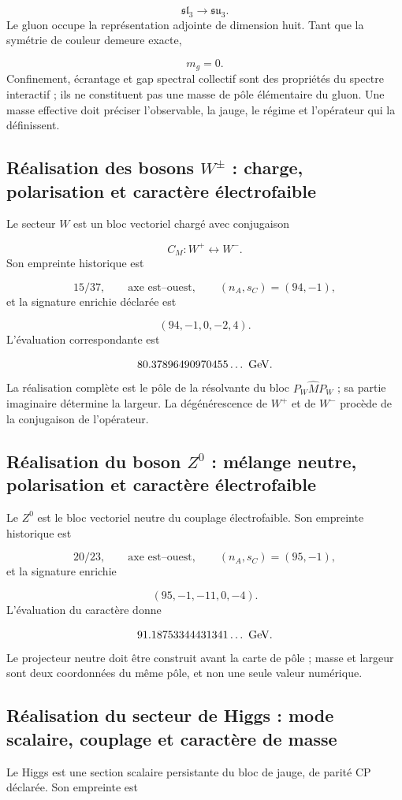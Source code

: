 \[
 \mathfrak{sl}_3\longrightarrow\mathfrak{su}_3.
\]
Le gluon occupe la représentation adjointe de dimension huit. Tant que la symétrie de couleur demeure exacte,

\[
 m_g=0.
\]
Confinement, écrantage et gap spectral collectif sont des propriétés du spectre interactif ; ils ne constituent pas une masse de pôle élémentaire du gluon. Une masse effective doit préciser l'observable, la jauge, le régime et l'opérateur qui la définissent.

\subsection{Réalisation des bosons \(W^\pm\) : charge, polarisation et caractère électrofaible}
Le secteur \(W\) est un bloc vectoriel chargé avec conjugaison

\[
 C_M:W^+\longleftrightarrow W^-.
\]
Son empreinte historique est

\[
 15/37,\qquad \text{axe est--ouest},\qquad
 (n_A,s_C)=(94,-1),
\]
et la signature enrichie déclarée est

\[
 (94,-1,0,-2,4).
\]
L'évaluation correspondante est

\[
 80.37896490970455\ldots\ {\rm GeV}.
\]
La réalisation complète est le pôle de la résolvante du bloc \(P_W\widehat M P_W\) ; sa partie imaginaire détermine la largeur. La dégénérescence de \(W^+\) et de \(W^-\) procède de la conjugaison de l'opérateur.

\subsection{Réalisation du boson \(Z^0\) : mélange neutre, polarisation et caractère électrofaible}
Le \(Z^0\) est le bloc vectoriel neutre du couplage électrofaible. Son empreinte historique est

\[
 20/23,\qquad \text{axe est--ouest},\qquad
 (n_A,s_C)=(95,-1),
\]
et la signature enrichie

\[
 (95,-1,-11,0,-4).
\]
L'évaluation du caractère donne

\[
 91.18753344431341\ldots\ {\rm GeV}.
\]
Le projecteur neutre doit être construit avant la carte de pôle ; masse et largeur sont deux coordonnées du même pôle, et non une seule valeur numérique.

\subsection{Réalisation du secteur de Higgs : mode scalaire, couplage et caractère de masse}
Le Higgs est une section scalaire persistante du bloc de jauge, de parité CP déclarée. Son empreinte est

